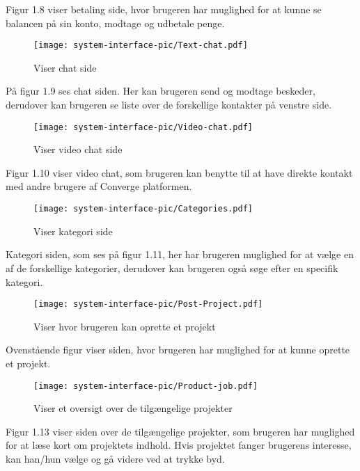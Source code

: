 Figur 1.8 viser betaling side, hvor brugeren har muglighed for at kunne se balancen på sin konto, modtage og udbetale penge. 

\begin{figure}[ht]
    \centering
\texttt{[image: system-interface-pic/Text-chat.pdf]}
\caption{Viser chat side}
\label{fig:figure2}
\end{figure}

På figur 1.9 ses chat siden. Her kan brugeren send og modtage beskeder, derudover kan brugeren se liste over de forskellige kontakter på venstre side. 

\newpage
\begin{figure}[ht]
    \centering
\texttt{[image: system-interface-pic/Video-chat.pdf]}
\caption{Viser video chat side}
\label{fig:figure2}
\end{figure}
Figur 1.10 viser video chat, som brugeren kan benytte til at have direkte kontakt med andre brugere af Converge platformen. 

\begin{figure}[ht]
    \centering
\texttt{[image: system-interface-pic/Categories.pdf]}
\caption{Viser kategori side}
\label{fig:figure2}
\end{figure}

Kategori siden, som ses på figur 1.11, her har brugeren muglighed for at vælge en af de forskellige kategorier, derudover kan brugeren også søge efter en specifik kategori.

\newpage
\begin{figure}[ht]
    \centering
\texttt{[image: system-interface-pic/Post-Project.pdf]}
\caption{Viser hvor brugeren kan oprette et projekt}
\label{fig:figure2}
\end{figure}

Ovenstående figur viser siden, hvor brugeren har muglighed for at kunne oprette et projekt. 

\begin{figure}[ht]
    \centering
\texttt{[image: system-interface-pic/Product-job.pdf]}
\caption{Viser et oversigt over de tilgængelige projekter}
\label{fig:figure2}
\end{figure}

Figur 1.13 viser siden over de tilgængelige projekter, som brugeren har muglighed for at læse kort om projektets indhold. Hvis projektet fanger brugerens interesse, kan han/hun vælge og gå videre ved at trykke byd. 

